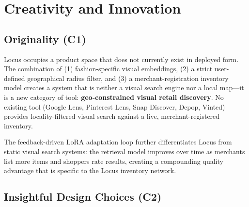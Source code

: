 \documentclass[12pt]{article}
\begin{document}
\section{Creativity and Innovation}
\label{sec:creativity}

\subsection{Originality (C1)}

Locus occupies a product space that does not currently exist in deployed form. The combination of (1) fashion-specific visual embeddings, (2) a strict user-defined geographical radius filter, and (3) a merchant-registration inventory model creates a system that is neither a visual search engine nor a local map---it is a new category of tool: \textbf{geo-constrained visual retail discovery}. No existing tool (Google Lens, Pinterest Lens, Snap Discover, Depop, Vinted) provides locality-filtered visual search against a live, merchant-registered inventory.

The feedback-driven LoRA adaptation loop further differentiates Locus from static visual search systems: the retrieval model improves over time as merchants list more items and shoppers rate results, creating a compounding quality advantage that is specific to the Locus inventory network.

\subsection{Insightful Design Choices (C2)}
\end{document}
